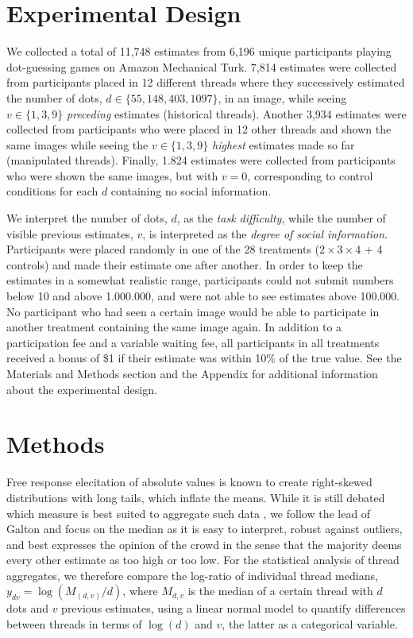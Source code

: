 \documentclass[9pt,twocolumn,twoside,lineno]{pnas-new}
\begin{document}
\section*{Experimental Design}
We collected a total of 11,748 estimates from 6,196 unique participants playing dot-guessing games on Amazon Mechanical Turk. 7,814 estimates were collected from participants placed in 12 different threads where they successively estimated the number of dots, $d \in \{55,148,403,1097\}$, in an image, while seeing $v \in \{1,3,9\}$ \textit{preceding} estimates (historical threads). Another 3,934 estimates were collected from participants who were placed in 12 other threads and shown the same images while seeing the $v \in \{1,3,9\}$ \textit{highest} estimates made so far (manipulated threads). Finally, 1.824 estimates were collected from participants who were shown the same images, but with $v=0$, corresponding to control conditions for each $d$ containing no social information. 

We interpret the number of dots, $d$, as the \textit{task difficulty}, while the number of visible previous estimates, $v$, is interpreted as the \textit{degree of social information}. Participants were placed randomly in one of the 28 treatments ($2 \times 3 \times 4$ + 4 controls)  and made their estimate one after another. In order to keep the estimates in a somewhat realistic range, participants could not submit numbers below 10 and above 1.000.000, and were not able to see estimates above 100.000. No participant who had seen a certain image would be able to participate in another treatment containing the same image again. In addition to a participation fee and a variable waiting fee, all participants in all treatments received a bonus of \$1 if their estimate was within 10\% of the true value. See the Materials and Methods section and the Appendix for additional information about the experimental design.

\section*{Methods}
Free response elecitation of absolute values is known to create right-skewed distributions with long tails, which inflate the means. While it is still debated which measure is best suited to aggregate such data \cite{kao2018counteracting}, we follow the lead of Galton \cite{galton1907vox} and focus on the median as it is easy to interpret, robust against outliers, and best expresses the opinion of the crowd in the sense that the majority deems every other estimate as too high or too low. For the statistical analysis of thread aggregates, we therefore compare the log-ratio of individual thread medians, $y_{dv}=\log(M_{(d,v)}/d)$, where $M_{d,v}$ is the median of a certain thread with $d$ dots and $v$ previous estimates, using a linear normal model to quantify differences between threads in terms of $\log(d)$ and $v$, the latter as a categorical variable. 
\end{document}
